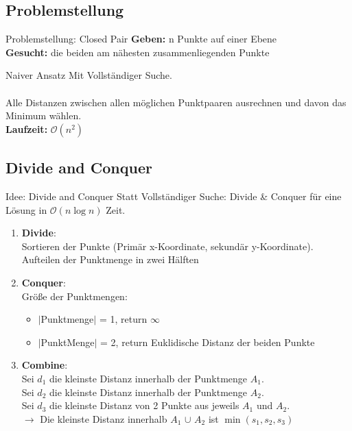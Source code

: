 \documentclass[18pt]{beamer}
\begin{document}
	\subsection{Problemstellung}
		\begin{frame}{Problemstellung: Closed Pair}
			\textbf{Geben:} n Punkte auf einer Ebene \\
			\textbf{Gesucht:} die beiden am nähesten zusammenliegenden Punkte\\
		
			\begin{block}{Naiver Ansatz}
				Mit Vollständiger Suche. \\
				\ \\
				Alle Distanzen zwischen allen möglichen Punktpaaren ausrechnen und davon das Minimum wählen. 
				\ \\
				\textbf{Laufzeit:} $\mathcal{O}(n^2)$
			\end{block}	
		\end{frame}
	
	\subsection{Divide and Conquer}
		\begin{frame}{Idee: Divide and Conquer}
			Statt Vollständiger Suche: Divide \& Conquer für eine Lösung in $\mathcal{O}(n \log n)$ Zeit.

			\begin{enumerate}
				\item \textbf{Divide}:\\ Sortieren der Punkte (Primär x-Koordinate, sekundär y-Koordinate). Aufteilen der Punktmenge in zwei Hälften
				\item \textbf{Conquer}:\\ Größe der Punktmengen:
					\begin{itemize}
						\item $|$Punktmenge$|$ = 1, return $ \infty$
						\item $|$PunktMenge$|$ = 2, return Euklidische Distanz der beiden Punkte
					\end{itemize}
				\item \textbf{Combine}: \\ Sei $d_{1}$ die kleinste Distanz innerhalb der Punktmenge $A_1$. \\
							Sei $d_2$ die kleinste Distanz innerhalb der Punktmenge $A_2$. \\
							Sei $d_{3}$ die kleinste Distanz von 2 Punkte aus jeweils $A_{1}$ und $A_{2}$.\\
							$\rightarrow$ Die kleinste Distanz innerhalb $A_1$ $\cup$ $A_2$ ist $\min(s_1,s_2, s_3)$ \\
			\end{enumerate}
		\end{frame}
\end{document}
